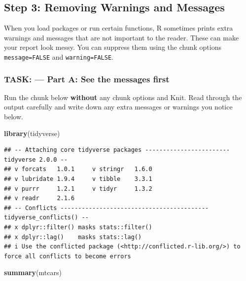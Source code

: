 \documentclass[
]{article}
\newenvironment{Shaded}{\begin{snugshade}}{\end{snugshade}}
\newcommand{\FunctionTok}[1]{\textcolor[rgb]{0.13,0.29,0.53}{\textbf{#1}}}
\newcommand{\NormalTok}[1]{#1}
\begin{document}
\subsection{Step 3: Removing Warnings and
Messages}\label{step-3-removing-warnings-and-messages}

When you load packages or run certain functions, R sometimes prints
extra warnings and messages that are not important to the reader. These
can make your report look messy. You can suppress them using the chunk
options \texttt{message=FALSE} and \texttt{warning=FALSE}.

\subsubsection{TASK: --- Part A: See the messages
first}\label{task-part-a-see-the-messages-first}

Run the chunk below \textbf{without} any chunk options and Knit. Read
through the output carefully and write down any extra messages or
warnings you notice below.

\begin{Shaded}
\begin{Highlighting}[]
\FunctionTok{library}\NormalTok{(tidyverse)}
\end{Highlighting}
\end{Shaded}

\begin{verbatim}
## -- Attaching core tidyverse packages ------------------------ tidyverse 2.0.0 --
## v forcats   1.0.1     v stringr   1.6.0
## v lubridate 1.9.4     v tibble    3.3.1
## v purrr     1.2.1     v tidyr     1.3.2
## v readr     2.1.6     
## -- Conflicts ------------------------------------------ tidyverse_conflicts() --
## x dplyr::filter() masks stats::filter()
## x dplyr::lag()    masks stats::lag()
## i Use the conflicted package (<http://conflicted.r-lib.org/>) to force all conflicts to become errors
\end{verbatim}

\begin{Shaded}
\begin{Highlighting}[]
\FunctionTok{summary}\NormalTok{(mtcars)}
\end{Highlighting}
\end{Shaded}
\end{document}
